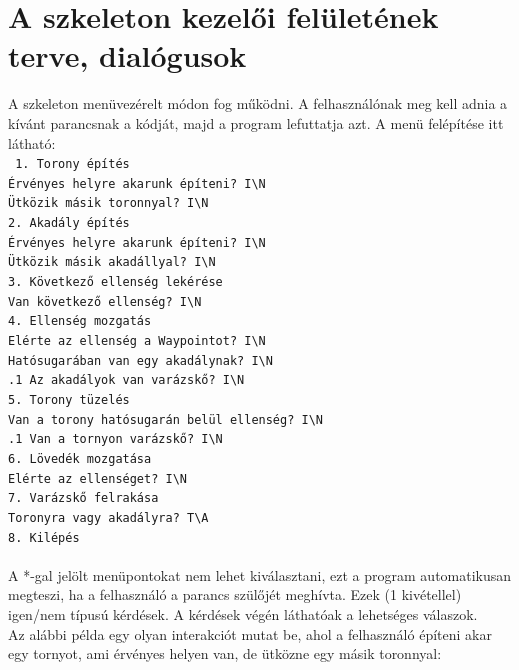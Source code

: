 \section{A szkeleton kezelői felületének terve, dialógusok}
A szkeleton menüvezérelt módon fog működni. A felhasználónak meg kell adnia a kívánt parancsnak a kódját, majd a program lefuttatja azt. A menü felépítése itt látható: \\
\begingroup 
\fontsize{10pt}{10pt}\selectfont
\texttt{
1. Torony építés \\
 Érvényes helyre akarunk építeni? I\textbackslash N \\
 Ütközik másik toronnyal? I\textbackslash N \\
2. Akadály építés \\
 Érvényes helyre akarunk építeni? I\textbackslash N \\
 Ütközik másik akadállyal? I\textbackslash N \\
3. Következő ellenség lekérése \\
 Van következő ellenség? I\textbackslash N \\
4. Ellenség mozgatás \\
 Elérte az ellenség a Waypointot? I\textbackslash N \\
 Hatósugarában van egy akadálynak? I\textbackslash N \\
\indent {}.1 Az akadályok van varázskő? I\textbackslash N \\
5. Torony tüzelés \\
 Van a torony hatósugarán belül ellenség? I\textbackslash N \\
\indent {}.1 Van a tornyon varázskő? I\textbackslash N \\
6. Lövedék mozgatása \\
 Elérte az ellenséget? I\textbackslash N \\
7. Varázskő felrakása \\
 Toronyra vagy akadályra? T\textbackslash A \\
8. Kilépés \\
} \\
\endgroup
A *-gal jelölt menüpontokat nem lehet kiválasztani, ezt a program automatikusan megteszi, ha a felhasználó a parancs szülőjét meghívta. Ezek (1 kivétellel) igen/nem típusú kérdések. A kérdések végén láthatóak a lehetséges válaszok.
\\
Az alábbi példa egy olyan interakciót mutat be, ahol a felhasználó építeni akar egy tornyot, ami érvényes helyen van, de ütközne egy másik toronnyal: \\
